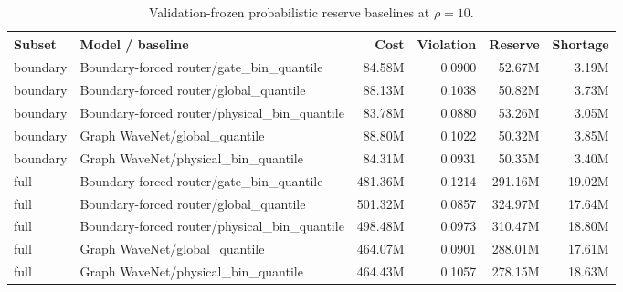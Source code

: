 \begin{table}[H]
\centering
\footnotesize
\setlength{\tabcolsep}{4pt}
\renewcommand{\arraystretch}{1.08}
\caption{Validation-frozen probabilistic reserve baselines at $\rho=10$.}
\begin{tabular}{llrrrr}
\toprule
Subset & Model / baseline & Cost & Violation & Reserve & Shortage \\
\midrule
boundary & Boundary-forced router/gate\_bin\_quantile & 84.58M & 0.0900 & 52.67M & 3.19M \\
boundary & Boundary-forced router/global\_quantile & 88.13M & 0.1038 & 50.82M & 3.73M \\
boundary & Boundary-forced router/physical\_bin\_quantile & 83.78M & 0.0880 & 53.26M & 3.05M \\
boundary & Graph WaveNet/global\_quantile & 88.80M & 0.1022 & 50.32M & 3.85M \\
boundary & Graph WaveNet/physical\_bin\_quantile & 84.31M & 0.0931 & 50.35M & 3.40M \\
full & Boundary-forced router/gate\_bin\_quantile & 481.36M & 0.1214 & 291.16M & 19.02M \\
full & Boundary-forced router/global\_quantile & 501.32M & 0.0857 & 324.97M & 17.64M \\
full & Boundary-forced router/physical\_bin\_quantile & 498.48M & 0.0973 & 310.47M & 18.80M \\
full & Graph WaveNet/global\_quantile & 464.07M & 0.0901 & 288.01M & 17.61M \\
full & Graph WaveNet/physical\_bin\_quantile & 464.43M & 0.1057 & 278.15M & 18.63M \\
\bottomrule
\end{tabular}
\end{table}
